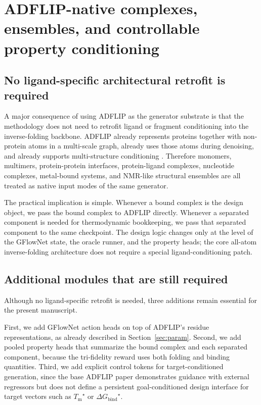 \documentclass[11pt]{article}
\newcommand{\Tm}{\ensuremath{T_{\mathrm m}}}
\newcommand{\DGbind}{\ensuremath{\Delta G_{\mathrm{bind}}}}
\begin{document}
\section{ADFLIP-native complexes, ensembles, and controllable property conditioning}
\label{sec:complexaware}

\subsection{No ligand-specific architectural retrofit is required}

A major consequence of using ADFLIP as the generator substrate is that the methodology does not need to retrofit ligand or fragment conditioning into the inverse-folding backbone. ADFLIP already represents proteins together with non-protein atoms in a multi-scale graph, already uses those atoms during denoising, and already supports multi-structure conditioning \citep{yi2025adflip}. Therefore monomers, multimers, protein-protein interfaces, protein-ligand complexes, nucleotide complexes, metal-bound systems, and NMR-like structural ensembles are all treated as native input modes of the same generator.

The practical implication is simple. Whenever a bound complex is the design object, we pass the bound complex to ADFLIP directly. Whenever a separated component is needed for thermodynamic bookkeeping, we pass that separated component to the same checkpoint. The design logic changes only at the level of the GFlowNet state, the oracle runner, and the property heads; the core all-atom inverse-folding architecture does not require a special ligand-conditioning patch.

\subsection{Additional modules that are still required}

Although no ligand-specific retrofit is needed, three additions remain essential for the present manuscript.

First, we add GFlowNet action heads on top of ADFLIP's residue representations, as already described in Section~\ref{sec:param}. Second, we add pooled property heads that summarize the bound complex and each separated component, because the tri-fidelity reward uses both folding and binding quantities. Third, we add explicit control tokens for target-conditioned generation, since the base ADFLIP paper demonstrates guidance with external regressors but does not define a persistent goal-conditioned design interface for target vectors such as $\Tm^\star$ or $\DGbind^\star$.
\end{document}
